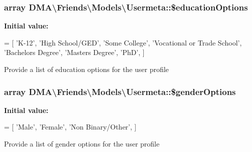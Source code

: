 \subsubsection[{\$education\+Options}]{\setlength{\rightskip}{0pt plus 5cm}array D\+M\+A\textbackslash{}\+Friends\textbackslash{}\+Models\textbackslash{}\+Usermeta\+::\$education\+Options\hspace{0.3cm}{\ttfamily [static]}}\label{classDMA_1_1Friends_1_1Models_1_1Usermeta_a2d958b56be7414a58e8db11ce8b636ae}
{\bfseries Initial value\+:}
\begin{DoxyCode}
= [
        \textcolor{stringliteral}{'K-12'},
        \textcolor{stringliteral}{'High School/GED'},
        \textcolor{stringliteral}{'Some College'},
        \textcolor{stringliteral}{'Vocational or Trade School'},
        \textcolor{stringliteral}{'Bachelors Degree'},
        \textcolor{stringliteral}{'Masters Degree'},
        \textcolor{stringliteral}{'PhD'},
    ]
\end{DoxyCode}
Provide a list of education options for the user profile \hypertarget{classDMA_1_1Friends_1_1Models_1_1Usermeta_a85cf8b9b7dd2582d64ac9e130dd0069d}{}
\subsubsection[{\$gender\+Options}]{\setlength{\rightskip}{0pt plus 5cm}array D\+M\+A\textbackslash{}\+Friends\textbackslash{}\+Models\textbackslash{}\+Usermeta\+::\$gender\+Options\hspace{0.3cm}{\ttfamily [static]}}\label{classDMA_1_1Friends_1_1Models_1_1Usermeta_a85cf8b9b7dd2582d64ac9e130dd0069d}
{\bfseries Initial value\+:}
\begin{DoxyCode}
= [
        \textcolor{stringliteral}{'Male'},
        \textcolor{stringliteral}{'Female'},
        \textcolor{stringliteral}{'Non Binary/Other'},
    ]
\end{DoxyCode}
Provide a list of gender options for the user profile \hypertarget{classDMA_1_1Friends_1_1Models_1_1Usermeta_a0578ccf8e50b07c1a6ec66118671d7a3}{}
